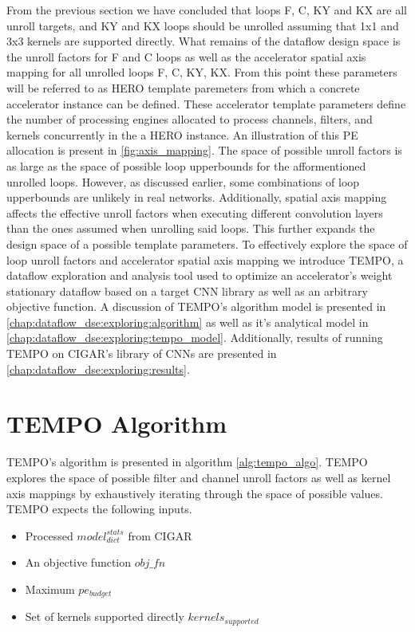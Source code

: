 From the previous section we have concluded that loops F, C, KY and KX are all
unroll targets, and KY and KX loops should be unrolled assuming that 1x1 and 3x3
kernels are supported directly. What remains of the dataflow design space is the unroll factors for F
and C loops as well as the accelerator spatial axis mapping for all unrolled
loops F, C, KY, KX. From this point these parameters will be referred to as
HERO template paremeters from which a concrete accelerator instance can
be defined. These accelerator template parameters define the number of
processing engines allocated to process channels, filters, and kernels
concurrently in the a HERO instance. An illustration of this \ac{PE}
allocation is present in \autoref{fig:axis_mapping}. The space of possible
unroll factors is as large as the space of possible loop upperbounds for the
afformentioned unrolled loops. However, as discussed earlier, some combinations
of loop upperbounds are unlikely in real networks. Additionally, spatial axis
mapping affects the effective unroll factors when executing different
convolution layers than the ones assumed when unrolling said loops. This further
expands the design space of a possible template parameters. To
effectively explore the space of loop unroll factors and accelerator spatial
axis mapping we introduce \ac{TEMPO}, a dataflow exploration and analysis tool
used to optimize an accelerator's weight stationary dataflow based on a target
CNN library as well as an arbitrary objective function. A discussion of
\ac{TEMPO}'s algorithm model is presented in
\autoref{chap:dataflow_dse:exploring:algorithm} as well as it's analytical model
in \autoref{chap:dataflow_dse:exploring:tempo_model}. Additionally, results
of running \ac{TEMPO} on CIGAR's library of CNNs are presented in
\autoref{chap:dataflow_dse:exploring:results}. 

\section{TEMPO Algorithm}
\label{chap:dataflow_dse:exploring:algorithm}

TEMPO's algorithm is presented in algorithm \ref{alg:tempo_algo}. TEMPO explores the
space of possible filter and channel unroll factors as well as kernel axis
mappings by exhaustively iterating through the space of possible values. TEMPO
expects the following inputs. 

\begin{itemize}
\item Processed $model^{stats}_{dict}$ from CIGAR
\item An objective function $obj\_fn$
\item Maximum $pe_{budget}$ 
\item Set of kernels supported directly  $kernels_{supported}$ 
\end{itemize}

